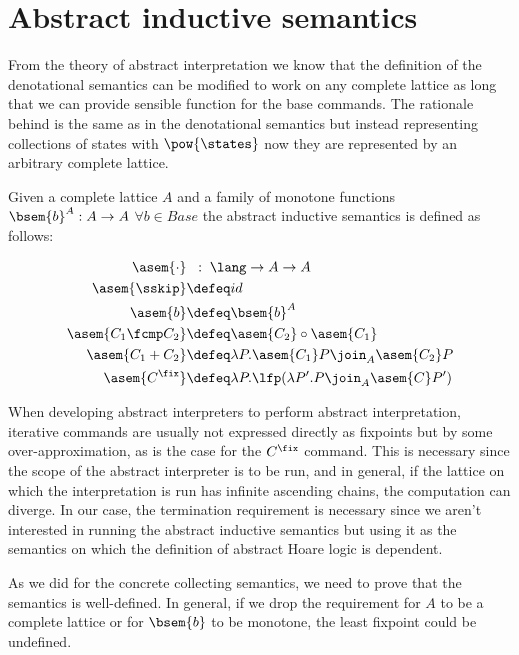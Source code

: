 \section{Abstract inductive semantics}

From the theory of abstract interpretation we know that the definition of the
denotational semantics can be modified to work on any complete lattice as long
that we can provide sensible function for the base commands. The rationale
behind is the same as in the denotational semantics but instead representing
collections of states with $\pow{\states}$ now they are represented by an
arbitrary complete lattice.

\begin{definition}

  \label{def:abstract-inductive-semantics}
  Given a complete lattice $A$ and a family of monotone functions $\bsem{b}^A : A
  \to A$ $\forall b \in Base$ the abstract inductive semantics is defined as 
  follows:

  \begin{align*}
      \asem{\cdot}         & \;\;:\; \lang \to A \to A \\
      \asem{\sskip}         &\defeq id \\
      \asem{b}             &\defeq \bsem{b}^A \\
      \asem{C_1 \fcmp C_2} &\defeq \asem{C_2} \circ \asem{C_1} \\
      \asem{C_1 + C_2}     &\defeq \lambda P . \asem{C_1} P \join_A \asem{C_2} P \\
      \asem{C^\fix}        &\defeq \lambda P . \lfp(\lambda P'. P \join_A \asem{C} P')
  \end{align*}
\end{definition}


When developing abstract interpreters to perform abstract interpretation,
iterative commands are usually not expressed directly as fixpoints but by
some over-approximation, as is the case for the $C^\fix$ command. This is
necessary since the scope of the abstract interpreter is to be run, and in
general, if the lattice on which the interpretation is run has infinite
ascending chains, the computation can diverge. In our case, the termination
requirement is necessary since we aren't interested in running the abstract
inductive semantics but using it as the semantics on which the definition of
abstract Hoare logic is dependent.


As we did for the concrete collecting semantics, we need to prove that the
semantics is well-defined. In general, if we drop the requirement for $A$
to be a complete lattice or for $\bsem{b}$ to be monotone, the least fixpoint
could be undefined.

